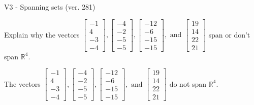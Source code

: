 \begin{exercise}
  \begin{exerciseTitle}V3 - Spanning sets (ver. 281)\end{exerciseTitle}
  \begin{exerciseStatement}
    Explain why the vectors \(\left[\begin{array}{r}
-1 \\
4 \\
-3 \\
-4
\end{array}\right] , \left[\begin{array}{r}
-4 \\
-2 \\
-5 \\
-5
\end{array}\right] , \left[\begin{array}{r}
-12 \\
-6 \\
-15 \\
-15
\end{array}\right] , \text{ and } \left[\begin{array}{r}
19 \\
14 \\
22 \\
21
\end{array}\right]\) span or don't span \(\mathbb{R}^4\). 
	


  \end{exerciseStatement}
  \begin{exerciseAnswer}
   The vectors \(\left[\begin{array}{r}
-1 \\
4 \\
-3 \\
-4
\end{array}\right] , \left[\begin{array}{r}
-4 \\
-2 \\
-5 \\
-5
\end{array}\right] , \left[\begin{array}{r}
-12 \\
-6 \\
-15 \\
-15
\end{array}\right] , \text{ and } \left[\begin{array}{r}
19 \\
14 \\
22 \\
21
\end{array}\right]\) 
  	 do not  
	span \(\mathbb{R}^4\).
  


  \end{exerciseAnswer}
\end{exercise}